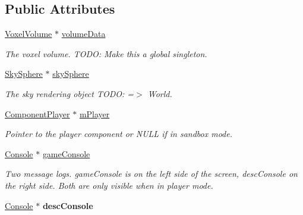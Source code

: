 \subsection*{\-Public \-Attributes}
\begin{DoxyCompactItemize}
\item 
\hypertarget{classGame_aebf1097335f249a78328c58b758be852}{
\hyperlink{classVoxelVolume}{\-Voxel\-Volume} $\ast$ \hyperlink{classGame_aebf1097335f249a78328c58b758be852}{volume\-Data}}
\label{d9/d68/classGame_aebf1097335f249a78328c58b758be852}

\begin{DoxyCompactList}\small\item\em \-The voxel volume. \-T\-O\-D\-O\-: \-Make this a global singleton. \end{DoxyCompactList}\item 
\hypertarget{classGame_a387ed48db30b84b41ae0026f0c9e87eb}{
\hyperlink{classSkySphere}{\-Sky\-Sphere} $\ast$ \hyperlink{classGame_a387ed48db30b84b41ae0026f0c9e87eb}{sky\-Sphere}}
\label{d9/d68/classGame_a387ed48db30b84b41ae0026f0c9e87eb}

\begin{DoxyCompactList}\small\item\em \-The sky rendering object \-T\-O\-D\-O\-: =$>$ \-World. \end{DoxyCompactList}\item 
\hypertarget{classGame_a9a10916cff6fb1b8f89c59f885bf3205}{
\hyperlink{classComponentPlayer}{\-Component\-Player} $\ast$ \hyperlink{classGame_a9a10916cff6fb1b8f89c59f885bf3205}{m\-Player}}
\label{d9/d68/classGame_a9a10916cff6fb1b8f89c59f885bf3205}

\begin{DoxyCompactList}\small\item\em \-Pointer to the player component or \-N\-U\-L\-L if in sandbox mode. \end{DoxyCompactList}\item 
\hypertarget{classGame_a35b5eca0e89712fe7ede45c946d2deed}{
\hyperlink{classConsole}{\-Console} $\ast$ \hyperlink{classGame_a35b5eca0e89712fe7ede45c946d2deed}{game\-Console}}
\label{d9/d68/classGame_a35b5eca0e89712fe7ede45c946d2deed}

\begin{DoxyCompactList}\small\item\em \-Two message logs. game\-Console is on the left side of the screen, desc\-Console on the right side. \-Both are only visible when in player mode. \end{DoxyCompactList}\item 
\hypertarget{classGame_a43e4efd49a1794f0d45135cd9521390a}{
\hyperlink{classConsole}{\-Console} $\ast$ {\bfseries desc\-Console}}
\label{d9/d68/classGame_a43e4efd49a1794f0d45135cd9521390a}


\end{DoxyCompactItemize}
